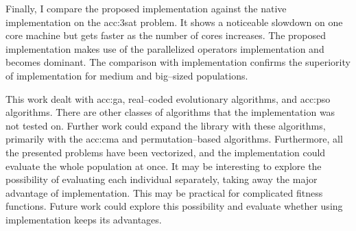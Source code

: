 Finally, I compare the proposed implementation against the native \cpp implementation on the \acrshort{acc:3sat} problem. It shows a noticeable slowdown on one core machine but gets faster as the number of cores increases. The proposed implementation makes use of the parallelized operators implementation and becomes dominant. The comparison with \cpp implementation confirms the superiority of \cuda implementation for medium and big--sized populations.

This work dealt with \acrshort{acc:ga}, real--coded evolutionary algorithms, and \acrshort{acc:pso} algorithms. There are other classes of algorithms that the implementation was not tested on. Further work could expand the library with these algorithms, primarily with the \acrshort{acc:cma} and permutation--based algorithms. Furthermore, all the presented problems have been vectorized, and the \gpu implementation could evaluate the whole population at once. It may be interesting to explore the possibility of evaluating each individual separately, taking away the major advantage of \gpu implementation. This may be practical for complicated fitness functions. Future work could explore this possibility and evaluate whether using \gpu implementation keeps its advantages.